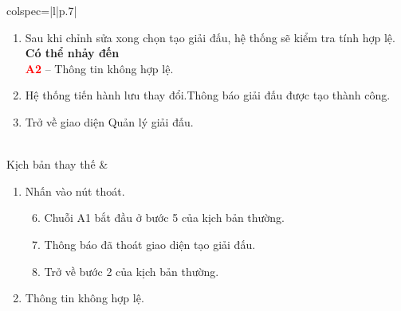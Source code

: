 \begin{longtblr}[caption = {Đặc tả usecase Tạo giải đấu},
      label = {tab:usecase2-spec},]{colspec={|l|p{.7\linewidth}|}}
\begin{minipage}{\linewidth}
\begin{enumerate}
                        \textbf{Có thể nhảy đến}\\
                        \textbf{\textcolor{red}{A1}} -- Trưởng ban tổ chức không nhập nữa và nhấn vào nút thoát.
                  \item Sau khi chỉnh sửa xong chọn tạo giải đấu, hệ thống sẽ kiểm tra tính hợp lệ.\\
                        \textbf{Có thể nhảy đến}\\
                        \textbf{\textcolor{red}{A2}} -- Thông tin không hợp lệ.
                  \item Hệ thống tiến hành lưu thay đổi.Thông báo giải đấu được tạo thành công.
                  \item Trở về giao diện Quản lý giải đấu.
            \end{enumerate}
            \vskip 1pt
      \end{minipage}
      \\\hline
      Kịch bản thay thế    &
      \begin{minipage}{\linewidth}
            \vskip 4pt
            \begin{enumerate}[label={\textbf{\textcolor{red}{A\arabic*}} --}, align=left, itemsep=-5pt]
                  \item  Nhấn vào nút thoát.  \\
                        \vspace{-1.5em}
                        \begin{enumerate}[leftmargin=-5px, align=left, label=\arabic*.]
                              \setcounter{enumii}{5}
                              \item[]
                                    \hspace{-25px} Chuỗi A1 bắt đầu ở bước 5 của kịch bản thường.
                              \item Thông báo đã thoát giao diện tạo giải đấu.
                              \item[]
                                    \hspace{-25px} Trở về bước 2 của kịch bản thường.
                        \end{enumerate}
                  \item Thông tin không hợp lệ. \\
                        \vspace{-1.5em}
                        \begin{enumerate}[leftmargin=-5px, align=left, label=\arabic*.]

\end{enumerate}
\end{enumerate}
\end{minipage}
\end{longtblr}

